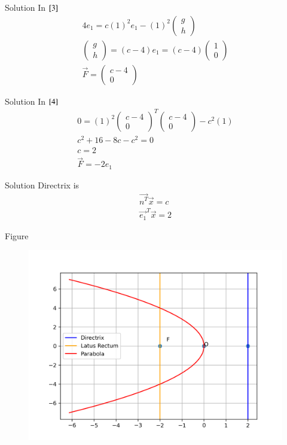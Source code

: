 \documentclass{beamer}
\begin{document}
\begin{frame}{Solution}
In $\eqref{3}$
\begin{align}
    4e_1=c(1)^2e_1-(1)^2\begin{pmatrix}g\\h\end{pmatrix}\\
    \begin{pmatrix}g\\h\end{pmatrix}=(c-4)e_1=(c-4)\begin{pmatrix}1\\0\end{pmatrix}\\
    \vec{F}=\begin{pmatrix}c-4\\0\end{pmatrix}
\end{align}
\end{frame}
\begin{frame}{Solution}
In $\eqref{4}$
\begin{align}
    0=(1)^2\begin{pmatrix}c-4\\0\end{pmatrix}^T\begin{pmatrix}c-4\\0\end{pmatrix}-c^2(1)\\
    c^2+16-8c-c^2=0\\
    c=2\\
    \vec{F}=-2e_1
\end{align}
\end{frame}
\begin{frame}{Solution}
Directrix is
\begin{align}
    \vec{n^T}\vec{x}=c\\
    \vec{e_1}^T\vec{x}=2
\end{align}
\end{frame}
\begin{frame}{Figure}
    \begin{figure}[H]
        \centering
        \includegraphics[width=0.9\columnwidth]{figs/figure.png}
        \caption{}
        \label{fig:placeholder}
    \end{figure}
\end{frame}
\end{document}
